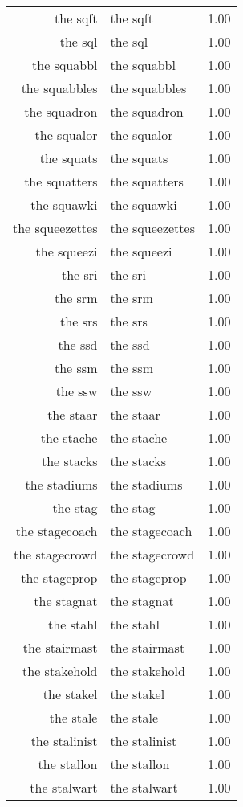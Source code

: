 \begin{table}[ht]
\begin{tabular}{rlr}
  the sqft & the sqft & 1.00 \\ 
  the sql & the sql & 1.00 \\ 
  the squabbl & the squabbl & 1.00 \\ 
  the squabbles & the squabbles & 1.00 \\ 
  the squadron & the squadron & 1.00 \\ 
  the squalor & the squalor & 1.00 \\ 
  the squats & the squats & 1.00 \\ 
  the squatters & the squatters & 1.00 \\ 
  the squawki & the squawki & 1.00 \\ 
  the squeezettes & the squeezettes & 1.00 \\ 
  the squeezi & the squeezi & 1.00 \\ 
  the sri & the sri & 1.00 \\ 
  the srm & the srm & 1.00 \\ 
  the srs & the srs & 1.00 \\ 
  the ssd & the ssd & 1.00 \\ 
  the ssm & the ssm & 1.00 \\ 
  the ssw & the ssw & 1.00 \\ 
  the staar & the staar & 1.00 \\ 
  the stache & the stache & 1.00 \\ 
  the stacks & the stacks & 1.00 \\ 
  the stadiums & the stadiums & 1.00 \\ 
  the stag & the stag & 1.00 \\ 
  the stagecoach & the stagecoach & 1.00 \\ 
  the stagecrowd & the stagecrowd & 1.00 \\ 
  the stageprop & the stageprop & 1.00 \\ 
  the stagnat & the stagnat & 1.00 \\ 
  the stahl & the stahl & 1.00 \\ 
  the stairmast & the stairmast & 1.00 \\ 
  the stakehold & the stakehold & 1.00 \\ 
  the stakel & the stakel & 1.00 \\ 
  the stale & the stale & 1.00 \\ 
  the stalinist & the stalinist & 1.00 \\ 
  the stallon & the stallon & 1.00 \\ 
  the stalwart & the stalwart & 1.00 \\ 

\end{tabular}
\end{table}
